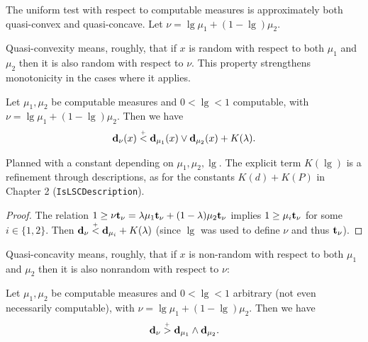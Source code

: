 The uniform test with respect to computable measures is approximately 
both quasi-convex and quasi-concave.
Let \( \nu=\lg\mu_{1}+(1-\lg)\mu_{2} \).

Quasi-convexity means, roughly, that if \( x \) is random with respect to both
\( \mu_{1} \) and \( \mu_{2} \) then it is also random with respect to \( \nu \).
This property strengthens monotonicity in the cases where it applies.

  \begin{proposition}\label{propo:test-computable-conv}
 Let \( \mu_{1},\mu_{2} \) be computable measures and \( 0<\lg<1 \) computable,
with \( \nu=\lg\mu_{1}+(1-\lg)\mu_{2} \).
 Then we have
  \begin{align*}
   \mathbf{d}_{\nu}(x) \stackrel{{}_+}{<}\mathbf{d}_{\mu_{1}}(x)\lor\mathbf{d}_{\mu_{2}}(x) + K(\lambda).
  \end{align*}
  \end{proposition}

\begin{formalization}
Planned with a constant depending on $\mu_{1},\mu_{2},\lg$. The explicit term $K(\lg)$ is a
refinement through descriptions, as for the constants $K(d)+K(P)$ in Chapter 2
(\texttt{IsLSCDescription}).
\end{formalization}
 \begin{proof}
The relation \( 1\ge\nu\mathbf{t}_{\nu}=\lambda\mu_{1}\mathbf{t}_{\nu}+(1-\lambda)\mu_{2}\mathbf{t}_{\nu} \)
implies \( 1\ge \mu_{i}\mathbf{t}_{\nu} \) for some \( i\in\{1,2\} \).
Then \( \mathbf{d}_{\nu}\stackrel{{}_+}{<}\mathbf{d}_{\mu_{i}}+K(\lambda) \) (since \( \lg \) was used to define \( \nu \) and
thus \( \mathbf{t}_{\nu} \)).
 \end{proof}

Quasi-concavity means, roughly, that if \( x \) is non-random with respect to both
\( \mu_{1} \) and \( \mu_{2} \) then it is also nonrandom with respect to \( \nu \):

  \begin{proposition}\label{propo:test-computable-conc}
 Let \( \mu_{1},\mu_{2} \) be computable measures and \( 0<\lg<1 \) arbitrary
(not even necessarily computable), with \( \nu=\lg\mu_{1}+(1-\lg)\mu_{2} \).
 Then we have
  \begin{align*}
   \mathbf{d}_{\nu} \stackrel{{}_+}{>}\mathbf{d}_{\mu_{1}}\land\mathbf{d}_{\mu_{2}}.
  \end{align*}
  \end{proposition}

